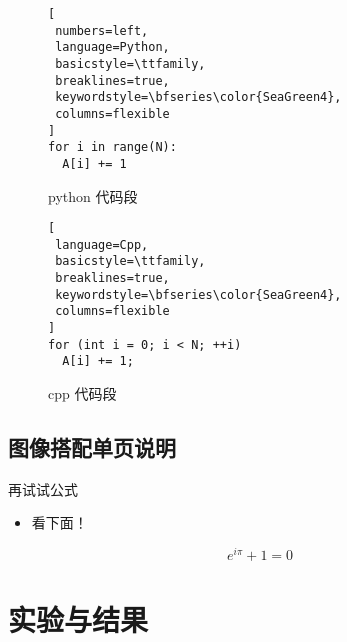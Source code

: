 \documentclass[
    fontset=fandol,
    xcolor=x11names %
]{ctexbeamer}
\begin{document}
\begin{frame}[fragile] %

\begin{minipage}{.49\linewidth}

\begin{figure}
\begin{lstlisting}[
 numbers=left,
 language=Python,
 basicstyle=\ttfamily,
 breaklines=true,
 keywordstyle=\bfseries\color{SeaGreen4},
 columns=flexible
]
for i in range(N):
  A[i] += 1
\end{lstlisting}
\caption{python 代码段}
\end{figure}

\end{minipage}\begin{minipage}{.49\linewidth}

\begin{figure}
\begin{lstlisting}[
 language=Cpp,
 basicstyle=\ttfamily,
 breaklines=true,
 keywordstyle=\bfseries\color{SeaGreen4},
 columns=flexible
]
for (int i = 0; i < N; ++i)
  A[i] += 1;
\end{lstlisting}
\caption{cpp 代码段}
\end{figure}

\end{minipage}
    
\end{frame}

\subsection{图像搭配单页说明}

\begin{frame}

    \begin{block}{再试试公式}
        \begin{itemize}
            \item 看下面！
        \end{itemize}
    \end{block}

    \begin{equation}
        e^{i\pi}+1=0
    \end{equation}

\end{frame}

\section{实验与结果}
\end{document}
